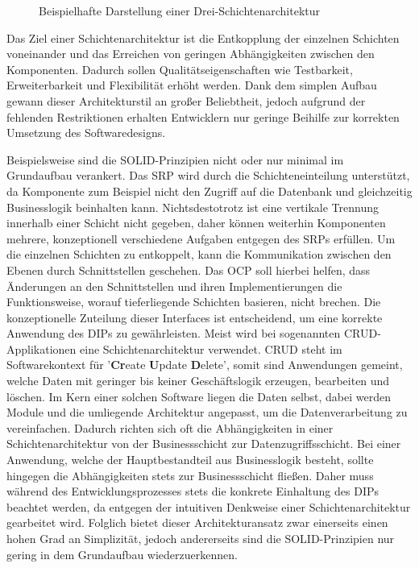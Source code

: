 \begin{figure}[htbp]
	\centering
	\large
	
	\caption{Beispielhafte Darstellung einer Drei-Schichtenarchitektur}
	\label{fig:Schichtenarchitektur}
\end{figure}

Das Ziel einer Schichtenarchitektur ist die Entkopplung der einzelnen Schichten voneinander und das Erreichen von geringen Abhängigkeiten zwischen den Komponenten. Dadurch sollen Qualitätseigenschaften wie Testbarkeit, Erweiterbarkeit und Flexibilität erhöht werden. Dank dem simplen Aufbau gewann dieser Architekturstil an großer Beliebtheit, jedoch aufgrund der fehlenden Restriktionen erhalten Entwicklern nur geringe Beihilfe zur korrekten Umsetzung des Softwaredesigns. 

Beispielsweise sind die SOLID-Prinzipien nicht oder nur minimal im Grundaufbau verankert. Das \acrlong{SRP} wird durch die Schichteneinteilung unterstützt, da Komponente zum Beispiel nicht den Zugriff auf die Datenbank und gleichzeitig Businesslogik beinhalten kann. Nichtsdestotrotz ist eine vertikale Trennung innerhalb einer Schicht nicht gegeben, daher können weiterhin Komponenten mehrere, konzeptionell verschiedene Aufgaben entgegen des SRPs erfüllen. Um die einzelnen Schichten zu entkoppelt, kann die Kommunikation zwischen den Ebenen durch Schnittstellen geschehen. Das \acrlong{OCP} soll hierbei helfen, dass Änderungen an den Schnittstellen und ihren Implementierungen die Funktionsweise, worauf tieferliegende Schichten basieren, nicht brechen. Die konzeptionelle Zuteilung dieser Interfaces ist entscheidend, um eine korrekte Anwendung des \acrlong{DIP}s zu gewährleisten. Meist wird bei sogenannten CRUD-Applikationen eine Schichtenarchitektur verwendet. \acrshort{CRUD} steht im Softwarekontext für '\textbf{Cr}eate \textbf{U}pdate \textbf{D}elete', somit sind Anwendungen gemeint, welche Daten mit geringer bis keiner Geschäftslogik erzeugen, bearbeiten und löschen. Im Kern einer solchen Software liegen die Daten selbst, dabei werden Module und die umliegende Architektur angepasst, um die Datenverarbeitung zu vereinfachen. Dadurch richten sich oft die Abhängigkeiten in einer Schichtenarchitektur von der Businessschicht zur Datenzugriffsschicht. Bei einer Anwendung, welche der Hauptbestandteil aus Businesslogik besteht, sollte hingegen die Abhängigkeiten stets zur Businessschicht fließen. Daher muss während des Entwicklungsprozesses stets die konkrete Einhaltung des DIPs beachtet werden, da entgegen der intuitiven Denkweise einer Schichtenarchitektur gearbeitet wird. Folglich bietet dieser Architekturansatz zwar einerseits einen hohen Grad an Simplizität, jedoch andererseits sind die SOLID-Prinzipien nur gering in dem Grundaufbau wiederzuerkennen.


